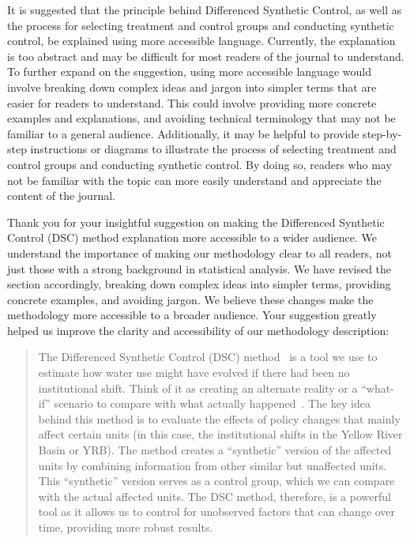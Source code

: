 \RC{}  It is suggested that the principle behind Differenced Synthetic Control, as well as the process for selecting treatment and control groups and conducting synthetic control, be explained using more accessible language. Currently, the explanation is too abstract and may be difficult for most readers of the journal to understand. To further expand on the suggestion, using more accessible language would involve breaking down complex ideas and jargon into simpler terms that are easier for readers to understand. This could involve providing more concrete examples and explanations, and avoiding technical terminology that may not be familiar to a general audience. Additionally, it may be helpful to provide step-by-step instructions or diagrams to illustrate the process of selecting treatment and control groups and conducting synthetic control. By doing so, readers who may not be familiar with the topic can more easily understand and appreciate the content of the journal.

\AR{} Thank you for your insightful suggestion on making the Differenced Synthetic Control (DSC) method explanation more accessible to a wider audience. We understand the importance of making our methodology clear to all readers, not just those with a strong background in statistical analysis. We have revised the section accordingly, breaking down complex ideas into simpler terms, providing concrete examples, and avoiding jargon. We believe these changes make the methodology more accessible to a broader audience. Your suggestion greatly helped us improve the clarity and accessibility of our methodology description:

\begin{quote}
    The Differenced Synthetic Control (DSC) method~\cite{arkhangelsky2021} is a tool we use to estimate how water use might have evolved if there had been no institutional shift.
    Think of it as creating an alternate reality or a ``what-if'' scenario to compare with what actually happened~\cite{abadie2010, abadie2015, hill2021}.
    The key idea behind this method is to evaluate the effects of policy changes that mainly affect certain units (in this case, the institutional shifts in the Yellow River Basin or YRB).
    The method creates a ``synthetic'' version of the affected units by combining information from other similar but unaffected units. This ``synthetic'' version serves as a control group, which we can compare with the actual affected units.
    The DSC method, therefore, is a powerful tool as it allows us to control for unobserved factors that can change over time, providing more robust results.
\end{quote}


